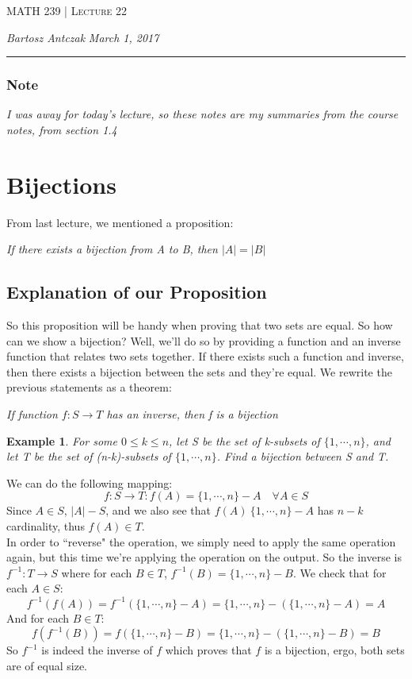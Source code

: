 \documentclass{report}
\newcommand{\lectureNum}{22}
\newcommand{\curDate}{March 1, 2017}
\newcommand{\course}{MATH 239}
\newtheorem{ex}{Example}[section]
\begin{document}
\begin{center}
\begin{Large}
\textsc{\course{} | Lecture \lectureNum{}}
\end{Large}
\end{center} 
\noindent \textit{Bartosz Antczak} \hfill
\textit{\curDate{}}
\rule{\textwidth}{0.4pt}
\subsubsection{Note}
\textit{I was away for today's lecture, so these notes are my summaries from the course notes, from section 1.4}
\section{Bijections}
From last lecture, we mentioned a proposition:
\begin{center}
\textit{If there exists a bijection from A to B, then $|A| = |B|$}
\end{center}
\subsection{Explanation of our Proposition}
So this proposition will be handy when proving that two sets are equal. So how can we show a bijection? Well, we'll do so by providing a function and an inverse function that relates two sets together. If there exists such a function and inverse, then there exists a bijection between the sets and they're equal. We rewrite the previous statements as a theorem:
\begin{center}
\textit{If function $f : S \rightarrow T$ has an inverse, then f is a bijection}
\end{center}
\begin{ex}
For some $0 \leq k \leq n$, let S be the set of k-subsets of $\{1, \cdots, n\}$, and let T be the set of (n-k)-subsets of $\{1, \cdots, n\}$. Find a bijection between S and T.
\end{ex}
We can do the following mapping:
$$f: S \rightarrow T : f(A) = \{1, \cdots, n\} - A \quad \forall A \in S$$
Since $A \in S$, $|A| - S$, and we also see that $f(A) \ \{1, \cdots, n\} - A$ has $n-k$ cardinality, thus $f(A) \in T$.\\In order to ``reverse" the operation, we simply need to apply the same operation again, but this time we're applying the operation on the output. So the inverse is $f^{-1}: T \rightarrow S$ where for each $B \in T$, $f^{-1}(B) = \{1, \cdots, n\} - B$. We check that for each $A \in S$:
$$f^{-1}(f(A)) = f^{-1}(\{1, \cdots, n\} - A) = \{1, \cdots, n\} - (\{1, \cdots, n\}- A) = A$$
And for each $B \in T$:
$$f(f^{-1}(B)) = f(\{1, \cdots, n\} - B) = \{1, \cdots, n\} - (\{1, \cdots, n\}- B) = B$$
So $f^{-1}$ is indeed the inverse of $f$ which proves that $f$ is a bijection, ergo, both sets are of equal size.
\end{document}
